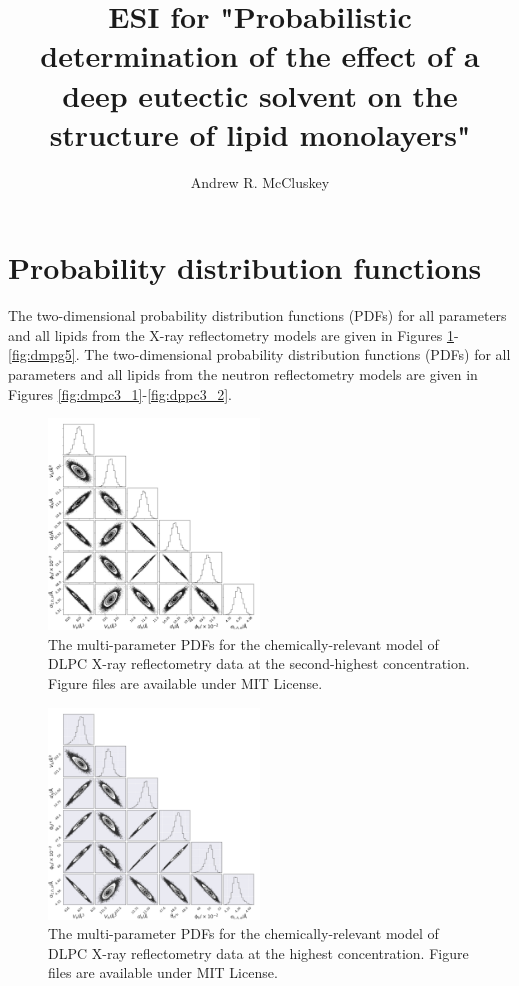 \documentclass[11pt,a4paper]{article}
\author{Andrew R. McCluskey}
\title{ESI for "Probabilistic determination of the effect of a deep eutectic solvent on the structure of lipid monolayers"}
\begin{document}
	
\section{Probability distribution functions}

The two-dimensional probability distribution functions (PDFs) for all parameters and all lipids from the X-ray reflectometry models are given in Figures \ref{fig:dlpc4}-\ref{fig:dmpg5}. The two-dimensional probability distribution functions (PDFs) for all parameters and all lipids from the neutron reflectometry models are given in Figures \ref{fig:dmpc3_1}-\ref{fig:dppc3_2}.
\begin{figure}[h]
	\centering
	\includegraphics[width=0.50\textwidth]{figures/dlpc4_all_corner}
	\caption{The multi-parameter PDFs for the chemically-relevant model of DLPC X-ray reflectometry data at the second-highest concentration. Figure files are available under MIT License.\cite{mccluskey_2018}}
	\label{fig:dlpc4}
\end{figure}
\begin{figure}
	\centering
	\includegraphics[width=0.50\textwidth]{figures/dlpc5_all_corner}
	\caption{The multi-parameter PDFs for the chemically-relevant model of DLPC X-ray reflectometry data at the highest concentration. Figure files are available under MIT License.\cite{mccluskey_2018}}
	\label{fig:dlpc5}
\end{figure}
\end{document}
